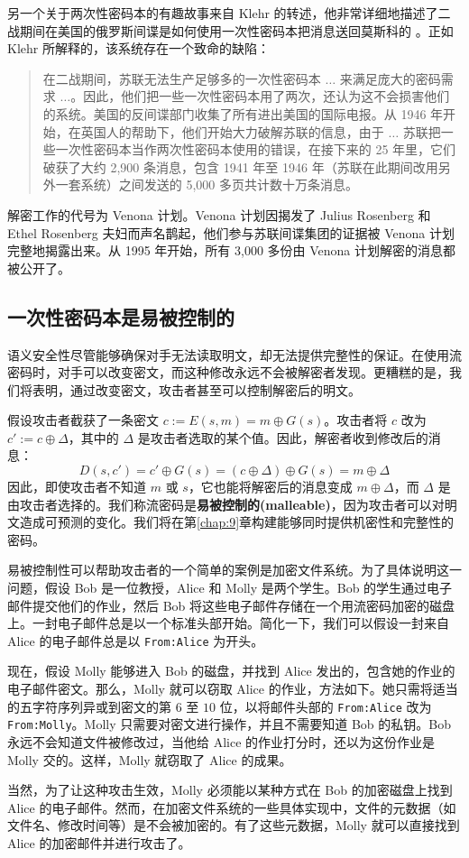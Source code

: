 另一个关于两次性密码本的有趣故事来自 Klehr 的转述，他非常详细地描述了二战期间在美国的俄罗斯间谍是如何使用一次性密码本把消息送回莫斯科的 \cite{haynes1999venona}。正如 Klehr 所解释的，该系统存在一个致命的缺陷：
\begin{quote}
在二战期间，苏联无法生产足够多的一次性密码本 $\dots$ 来满足庞大的密码需求 $\dots$。因此，他们把一些一次性密码本用了两次，还认为这不会损害他们的系统。美国的反间谍部门收集了所有进出美国的国际电报。从 1946 年开始，在英国人的帮助下，他们开始大力破解苏联的信息，由于 $\dots$ 苏联把一些一次性密码本当作两次性密码本使用的错误，在接下来的 25 年里，它们破获了大约 2,900 条消息，包含 1941 年至 1946 年（苏联在此期间改用另外一套系统）之间发送的 5,000 多页共计数十万条消息。
\end{quote}
解密工作的代号为 Venona 计划。Venona 计划因揭发了 Julius Rosenberg 和 Ethel Rosenberg 夫妇而声名鹊起，他们参与苏联间谍集团的证据被 Venona 计划完整地揭露出来。从 1995 年开始，所有 3,000 多份由 Venona 计划解密的消息都被公开了。

\subsection{一次性密码本是易被控制的}\label{subsec:3-3-2}

语义安全性尽管能够确保对手无法读取明文，却无法提供完整性的保证。在使用流密码时，对手可以改变密文，而这种修改永远不会被解密者发现。更糟糕的是，我们将表明，通过改变密文，攻击者甚至可以控制解密后的明文。

假设攻击者截获了一条密文 $c:=E(s,m)=m\oplus G(s)$。攻击者将 $c$ 改为 $c':=c\oplus\Delta$，其中的 $\Delta$ 是攻击者选取的某个值。因此，解密者收到修改后的消息：
\[
D(s,c')
=c'\oplus G(s)
=(c\oplus\Delta)\oplus G(s)
=m\oplus\Delta
\]
因此，即使攻击者不知道 $m$ 或 $s$，它也能将解密后的消息变成 $m\oplus\Delta$，而 $\Delta$ 是由攻击者选择的。我们称流密码是\textbf{易被控制的(malleable)}，因为攻击者可以对明文造成可预测的变化。我们将在第\ref{chap:9}章构建能够同时提供机密性和完整性的密码。

易被控制性可以帮助攻击者的一个简单的案例是加密文件系统。为了具体说明这一问题，假设 Bob 是一位教授，Alice 和 Molly 是两个学生。Bob 的学生通过电子邮件提交他们的作业，然后 Bob 将这些电子邮件存储在一个用流密码加密的磁盘上。一封电子邮件总是以一个标准头部开始。简化一下，我们可以假设一封来自 Alice 的电子邮件总是以 \texttt{From:Alice} 为开头。

现在，假设 Molly 能够进入 Bob 的磁盘，并找到 Alice 发出的，包含她的作业的电子邮件密文。那么，Molly 就可以窃取 Alice 的作业，方法如下。她只需将适当的五字符序列异或到密文的第 $6$ 至 $10$ 位，以将邮件头部的 \texttt{From:Alice} 改为 \texttt{From:Molly}。Molly 只需要对密文进行操作，并且不需要知道 Bob 的私钥。Bob 永远不会知道文件被修改过，当他给 Alice 的作业打分时，还以为这份作业是 Molly 交的。这样，Molly 就窃取了 Alice 的成果。

当然，为了让这种攻击生效，Molly 必须能以某种方式在 Bob 的加密磁盘上找到 Alice 的电子邮件。然而，在加密文件系统的一些具体实现中，文件的元数据（如文件名、修改时间等）是不会被加密的。有了这些元数据，Molly 就可以直接找到 Alice 的加密邮件并进行攻击了。